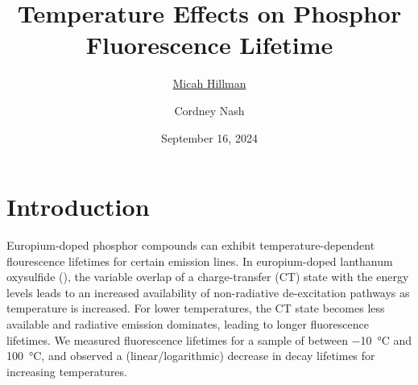 \documentclass[12pt]{article}
\title{Temperature Effects on Phosphor Fluorescence Lifetime}
\date{September 16, 2024}
\author{\ul{Micah Hillman} \and Cordney Nash}
\begin{document}
  \maketitle

  \section*{Introduction}{
    Europium-doped phosphor compounds can exhibit temperature-dependent flourescence lifetimes for certain emission lines. In europium-doped lanthanum oxysulfide (), the variable overlap of a charge-transfer (CT) state with the  energy levels leads to an increased availability of non-radiative de-excitation pathways as temperature is increased. For lower temperatures, the CT state becomes less available and radiative emission dominates, leading to longer fluorescence lifetimes. We measured fluorescence lifetimes for a sample of  between \SI{-10}{\degreeCelsius} and \SI{100}{\degreeCelsius}, and observed a (linear/logarithmic) decrease in decay lifetimes for increasing temperatures.
  }
\end{document}
